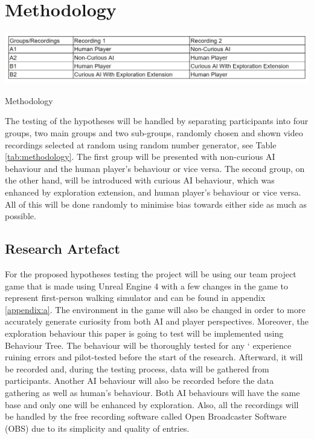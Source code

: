 \documentclass[journal]{IEEEtran}
\begin{document}
\section{Methodology}
\begin{table}
	\includegraphics[width=\linewidth]{MethodologyTable.PNG}
	\caption{Methodology}
	\label{tab:methodology}
\end{table}
The testing of the hypotheses will be handled by separating participants into four groups, two main groups and two sub-groups, randomly chosen and shown video recordings selected at random using random number generator, see Table \ref{tab:methodology}. The first group will be presented with non-curious AI behaviour and the human player's behaviour or vice versa. The second group, on the other hand, will be introduced with curious AI behaviour, which was enhanced by exploration extension, and human player's behaviour or vice versa. All of this will be done randomly to minimise bias towards either side as much as possible. %

\subsection{Research Artefact} %
For the proposed hypotheses testing the project will be using our team project game that is made using Unreal Engine 4 with a few changes in the game to represent first-person walking simulator and can be found in appendix \ref{appendix:a}. The environment in the game will also be changed in order to more accurately generate curiosity from both AI and player perspectives. Moreover, the exploration behaviour this paper is going to test will be implemented using Behaviour Tree. The behaviour will be thoroughly tested for any ` experience ruining errors and pilot-tested before the start of the research. Afterward, it will be recorded and, during the testing process, data will be gathered from participants. Another AI behaviour will also be recorded before the data gathering as well as human's behaviour. Both AI behaviours will have the same base and only one will be enhanced by exploration. Also, all the recordings will be handled by the free recording software called Open Broadcaster Software (OBS) due to its simplicity and quality of entries.
\end{document}
